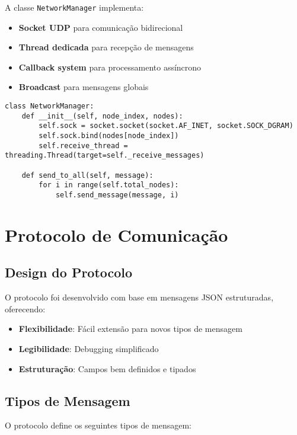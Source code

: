 \documentclass[12pt,a4paper]{article}
\begin{document}
A classe \texttt{NetworkManager} implementa:

\begin{itemize}
    \item \textbf{Socket UDP} para comunicação bidirecional
    \item \textbf{Thread dedicada} para recepção de mensagens
    \item \textbf{Callback system} para processamento assíncrono
    \item \textbf{Broadcast} para mensagens globais
\end{itemize}

\begin{lstlisting}[caption=Estrutura do NetworkManager]
class NetworkManager:
    def __init__(self, node_index, nodes):
        self.sock = socket.socket(socket.AF_INET, socket.SOCK_DGRAM)
        self.sock.bind(nodes[node_index])
        self.receive_thread = threading.Thread(target=self._receive_messages)
        
    def send_to_all(self, message):
        for i in range(self.total_nodes):
            self.send_message(message, i)
\end{lstlisting}

\section{Protocolo de Comunicação}

\subsection{Design do Protocolo}

O protocolo foi desenvolvido com base em mensagens JSON estruturadas, oferecendo:

\begin{itemize}
    \item \textbf{Flexibilidade}: Fácil extensão para novos tipos de mensagem
    \item \textbf{Legibilidade}: Debugging simplificado
    \item \textbf{Estruturação}: Campos bem definidos e tipados
\end{itemize}

\subsection{Tipos de Mensagem}

O protocolo define os seguintes tipos de mensagem:
\end{document}
